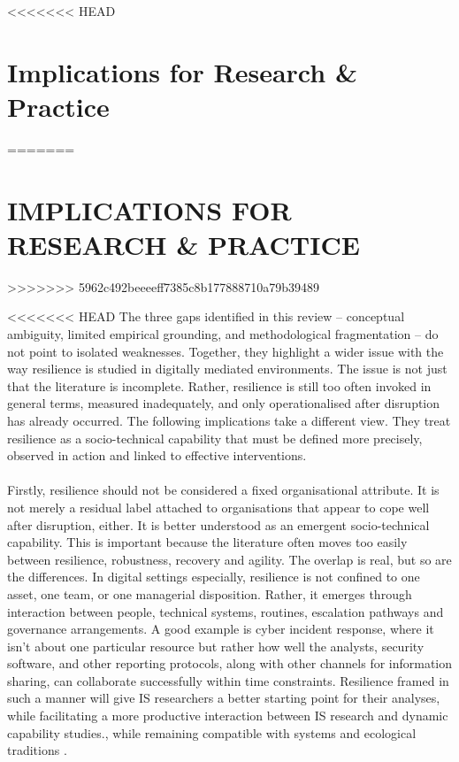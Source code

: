 <<<<<<< HEAD
\section{Implications for Research \& Practice}
=======
\section{\MakeUppercase {Implications for Research \& Practice}}
>>>>>>> 5962c492beeeeff7385c8b177888710a79b39489
\label{sec:ImplicationsResearch}
\renewcommand{\baselinestretch}{2.0}\normalsize

<<<<<<< HEAD
The three gaps identified in this review -- conceptual ambiguity, limited empirical grounding, and methodological fragmentation -- do not point to isolated weaknesses. Together, they highlight a wider issue with the way resilience is studied in digitally mediated environments. The issue is not just that the literature is incomplete. Rather, resilience is still too often invoked in general terms, measured inadequately, and only operationalised after disruption has already occurred. The following implications take a different view. They treat resilience as a socio-technical capability that must be defined more precisely, observed in action and linked to effective interventions.\\
\\
Firstly, resilience should not be considered a fixed organisational attribute. It is not merely a residual label attached to organisations that appear to cope well after disruption, either. It is better understood as an emergent socio-technical capability. This is important because the literature often moves too easily between resilience, robustness, recovery and agility\autocite{woods2015four,duchek2020organizational}. The overlap is real, but so are the differences. In digital settings especially, resilience is not confined to one asset, one team, or one managerial disposition. Rather, it emerges through interaction between people, technical systems, routines, escalation pathways and governance arrangements. A good example is cyber incident response, where it isn't about one particular resource but rather how well the analysts, security software, and other reporting protocols, along with other channels for information sharing, can collaborate successfully within time constraints. Resilience framed in such a manner will give IS researchers a better starting point for their analyses, while facilitating a more productive interaction between IS research and dynamic capability studies.\autocite{henfridsson2013generative,boh2023building}, while remaining compatible with systems and ecological traditions \autocite{holling1973resilience,wiener1948cybernetics}.\\
